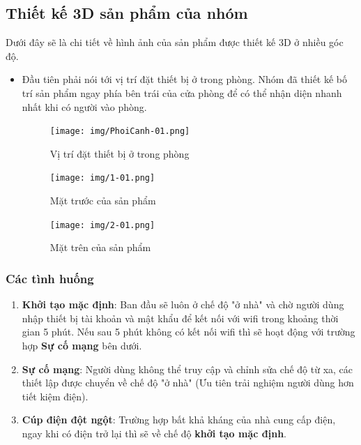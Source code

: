 \documentclass{report}
\begin{document}
\subsection{Thiết kế 3D sản phẩm của nhóm}
Dưới đây sẽ là chi tiết về hình ảnh của sản phẩm được thiết kế 3D ở nhiều góc độ.
\begin{itemize}
    \item Đầu tiên phải nói tới vị trí đặt thiết bị ở trong phòng. Nhóm đã thiết kế bố trí sản phẩm ngay phía bên trái của cửa phòng để có thể nhận diện nhanh nhất khi có người vào phòng.
    \begin{figure}[!h]
        \centering
        \texttt{[image: img/PhoiCanh-01.png]}
        \caption{Vị trí đặt thiết bị ở trong phòng}
    \end{figure}

    \begin{figure}[!ht]
        \centering
        \texttt{[image: img/1-01.png]}
        \caption{Mặt trước của sản phẩm}
    \end{figure}

    \begin{figure}[!ht]
        \centering
        \texttt{[image: img/2-01.png]}
        \caption{Mặt trên của sản phẩm}
    \end{figure}
\end{itemize}

\newpage
\subsubsection{Các tình huống}
\begin{enumerate}
    \item \textbf{Khởi tạo mặc định}: Ban đầu sẽ luôn ở chế độ "ở nhà" và chờ người dùng nhập thiết bị tài khoản và mật khẩu để kết nối với wifi trong khoảng thời gian 5 phút. Nếu sau 5 phút không có kết nối wifi thì sẽ hoạt động với trường hợp \textbf{Sự cố mạng} bên dưới.

    \item \textbf{Sự cố mạng}: Người dùng không thể truy cập và chỉnh sửa chế độ từ xa, các thiết lập được chuyển về chế độ "ở nhà" (Ưu tiên trải nghiệm người dùng hơn tiết kiệm điện). 
    
    \item \textbf{Cúp điện đột ngột}: Trường hợp bất khả kháng của nhà cung cấp điện, ngay khi có điện trở lại thì sẽ về chế độ \textbf{khởi tạo mặc định}.
\end{enumerate}
\end{document}
